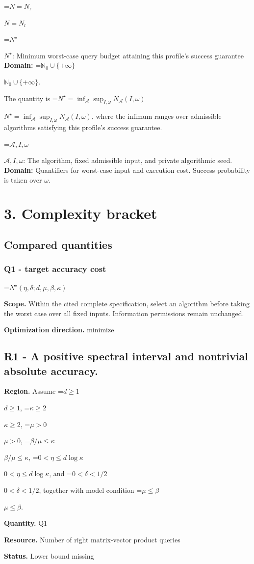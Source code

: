 \documentclass[10pt,a4paper]{article}
\newcommand{\AtlasMath}[1]{\par\begingroup\centering\setbox0=\hbox{$\displaystyle #1$}\ifdim\wd0>1.4\linewidth\typeout{ATLAS WIDE FORMULA: \the\wd0}\fi\ifdim\wd0>\linewidth\resizebox{\linewidth}{!}{\box0}\else\box0\fi\par\endgroup}
\newcommand{\AtlasInlineMath}[1]{\begingroup\setbox0=\hbox{$#1$}\ifdim\wd0>.4\linewidth\endgroup\AtlasMath{#1}\else\endgroup$#1$\fi}
\begin{document}
\AtlasInlineMath{N=N_{\mathrm r}}

\AtlasInlineMath{N^\star}: Minimum worst-case query budget attaining this profile's success guarantee \textbf{Domain:} \AtlasInlineMath{\mathbb N_0\cup\{+\infty\}}.

The quantity is \AtlasInlineMath{N^\star=\inf_{\mathcal A}\sup_{I,\omega}N_{\mathcal A}(I,\omega)}, where the infimum ranges over admissible algorithms satisfying this profile's success guarantee.

\AtlasInlineMath{\mathcal A,I,\omega}: The algorithm, fixed admissible input, and private algorithmic seed. \textbf{Domain:} Quantifiers for worst-case input and execution cost. Success probability is taken over $\omega$.

\section{3. Complexity bracket}
\subsection{Compared quantities}
\subsubsection{Q1 - target accuracy cost}
\AtlasMath{N^\star(\eta,\delta;d,\mu,\beta,\kappa)}
\textbf{Scope.} Within the cited complete specification, select an algorithm before taking the worst case over all fixed inputs. Information permissions remain unchanged.

\textbf{Optimization direction.} minimize

\subsection{R1 - A positive spectral interval and nontrivial absolute accuracy.}
\textbf{Region.} Assume \AtlasInlineMath{d\ge1}, \AtlasInlineMath{\kappa\ge2}, \AtlasInlineMath{\mu>0}, \AtlasInlineMath{\beta/\mu\le\kappa}, \AtlasInlineMath{0<\eta\le d\log\kappa}, and \AtlasInlineMath{0<\delta<1/2}, together with model condition \AtlasInlineMath{\mu\le\beta}.

\textbf{Quantity.} Q1

\textbf{Resource.} Number of right matrix-vector product queries

\textbf{Status.} Lower bound missing
\end{document}
